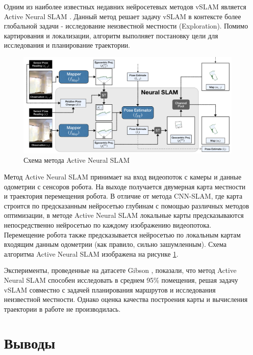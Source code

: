 \documentclass{mipt-thesis-ms}
\begin{document}
	Одним из наиболее известных недавних нейросетевых методов vSLAM является Active Neural SLAM \cite{chaplot2020learning}. Данный метод решает задачу vSLAM в контексте более глобальной задачи - исследование неизвестной местности (Exploration). Помимо картирования и локализации, алгоритм выполняет постановку цели для исследования и планирование траектории.
	
	\begin{figure}
		\includegraphics[width=1.0\textwidth]{img/ans_scheme.png}
		\caption{Схема метода Active Neural SLAM}
		\label{figure_active_neural_slam}
	\end{figure}
		
	Метод Active Neural SLAM принимает на вход видеопоток с камеры и данные одометрии с сенсоров робота. На выходе получается двумерная карта местности и траектория перемещения робота. В отличие от метода CNN-SLAM, где карта строится по предсказанным нейросетью глубинам с помощью различных методов оптимизации, в методе Active Neural SLAM локальные карты предсказываются непосредственно нейросетью по каждому изображению видеопотока. Перемещение робота также предсказывается нейросетью по локальным картам входящим данным одометрии (как правило, сильно зашумленным). Схема алгоритма Active Neural SLAM изображена на рисунке \ref{figure_active_neural_slam}.
	
	Эксперименты, проведенные на датасете Gibson \cite{xia2018gibson}, показали, что метод Active Neural SLAM способен исследовать в среднем 95\% помещения, решая задачу vSLAM совместно с задачей планирования маршрутов и исследования неизвестной местности. Однако оценка качества построения карты и вычисления траектории в работе \cite{chaplot2020learning} не производилась.
	
	\section{Выводы}
	
\end{document}
